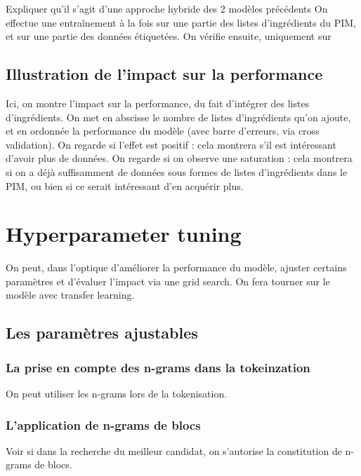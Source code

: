         Expliquer qu'il s'agit d'une approche hybride des 2 modèles précédents
        On effectue une entraînement à la fois sur une partie des listes d'ingrédients du PIM, et sur une partie des données étiquetées.
        On vérifie ensuite, uniquement sur 

        \section{Illustration de l'impact sur la performance}

        Ici, on montre l'impact sur la performance, du fait d'intégrer des listes d'ingrédients.
        On met en abscisse le nombre de listes d'ingrédients qu'on ajoute, et en ordonnée la performance du modèle (avec barre d'erreurs, via cross validation).
        On regarde si l'effet est positif : cela montrera s'il est intéressant d'avoir plus de données.
        On regarde si on observe une saturation : cela montrera si on a déjà suffisamment de données sous formes de listes d'ingrédients dans le PIM, ou bien si ce serait intéressant d'en acquérir plus.

    \chapter{Hyperparameter tuning}
            
    On peut, dans l'optique d'améliorer la performance du modèle, ajuster certains paramètres et d'évaluer l'impact via une grid search.
    On fera tourner sur le modèle avec transfer learning.

        \section{Les paramètres ajustables}

            \subsection{La prise en compte des \og n-grams \fg dans la tokeinzation}

            On peut utiliser les n-grams lors de la tokenisation.

            \subsection{L'application de \og n-grams \fg de blocs}

            Voir si dans la recherche du meilleur candidat, on s'autorise la constitution de \og n-grams \fg de blocs.


